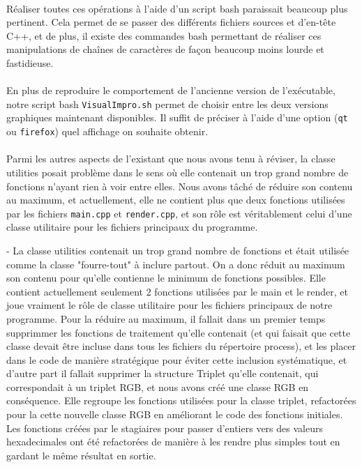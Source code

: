\paragraph{}
Réaliser toutes ces opérations à l'aide d'un script bash paraissait
beaucoup plus pertinent. Cela permet de se passer des différents
fichiers sources et d'en-tête C++, et de plus, il existe des commandes
bash permettant de réaliser ces manipulations de chaînes de caractères
de façon beaucoup moins lourde et fastidieuse.
\paragraph{}
En plus de reproduire le comportement de l'ancienne version de
l'exécutable, notre script bash \verb!VisualImpro.sh! permet de
choisir entre les deux versions graphiques maintenant disponibles. Il
suffit de préciser à l'aide d'une option (\verb!qt! ou \verb!firefox!)
quel affichage on souhaite obtenir.
\paragraph{}
Parmi les autres aspects de l'existant que nous avons tenu à réviser,
la classe utilities posait problème dans le sens où elle contenait un
trop grand nombre de fonctions n'ayant rien à voir entre elles. Nous
avons tâché de réduire son contenu au maximum, et actuellement, elle
ne contient plus que deux fonctions utilisées par les fichiers
\verb!main.cpp! et \verb!render.cpp!, et son rôle est véritablement
celui d'une classe utilitaire pour les fichiers principaux du
programme.

- La classe utilities contenait un trop grand nombre de fonctions et était
  utilisée comme la classe "fourre-tout" à inclure partout. On a donc réduit
  au maximum son contenu pour qu'elle contienne le minimum de fonctions
  possibles. Elle contient actuellement seulement 2 fonctions utilisées par le
  main et le render, et joue vraiment le rôle de classe utilitaire pour les
  fichiers principaux de notre programme. Pour la réduire au maximum, il fallait
  dans un premier temps supprimmer les fonctions de traitement qu'elle contenait
  (et qui faisait que cette classe devait être incluse dans tous les fichiers du
  répertoire process), et les placer dans le code de manière stratégique pour
  éviter cette inclusion systématique, et d'autre part il fallait
  supprimer la structure Triplet qu'elle contenait, qui correspondait à un
  triplet RGB, et nous avons créé une classe RGB en conséquence. Elle regroupe
  les fonctions utilisées pour la classe triplet, refactorées pour la cette
  nouvelle classe RGB en améliorant le code des fonctions initiales. Les
  fonctions créées par le stagiaires pour passer d'entiers vers des valeurs
  hexadecimales ont été refactorées de manière à les rendre plus simples tout
  en gardant le même résultat en sortie.

